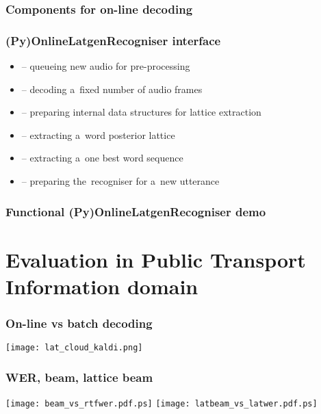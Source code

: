 \begin{frame}\frametitle{Components for on-line decoding} 
    \begin{center}
        
    \end{center}
\end{frame}

\begin{frame}\frametitle{(Py)OnlineLatgenRecogniser interface} 
    \begin{itemize}
        \item {} -- queueing new audio for pre-processing
        \item {} -- decoding a~fixed number of audio frames
        \item {} -- preparing internal data structures for lattice extraction
        \item {} -- extracting a~word posterior lattice
        \item {} -- extracting a~one best word sequence
        \item {} -- preparing the~recogniser for a~new utterance
    \end{itemize}
\end{frame}

\begin{frame}\frametitle{Functional (Py)OnlineLatgenRecogniser demo} 
    \begin{center}
        
    \end{center}
\end{frame}


\section[Evaluation in PTI]{Evaluation in Public Transport Information domain}%

\begin{frame}\frametitle{On-line vs batch decoding} 
    \begin{center}
        \texttt{[image: lat\_cloud\_kaldi.png]}
    \end{center}
\end{frame}

\begin{frame}\frametitle{WER, beam, lattice beam} 
    \texttt{[image: beam\_vs\_rtfwer.pdf.ps]}
    \texttt{[image: latbeam\_vs\_latwer.pdf.ps]}
\end{frame}

